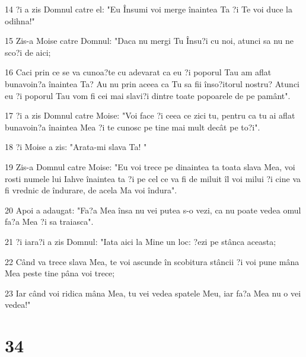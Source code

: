 \par 14 ?i a zis Domnul catre el: "Eu Însumi voi merge înaintea Ta ?i Te voi duce la odihna!"
\par 15 Zis-a Moise catre Domnul: "Daca nu mergi Tu Însu?i cu noi, atunci sa nu ne sco?i de aici;
\par 16 Caci prin ce se va cunoa?te cu adevarat ca eu ?i poporul Tau am aflat bunavoin?a înaintea Ta? Au nu prin aceea ca Tu sa fii înso?itorul nostru? Atunci eu ?i poporul Tau vom fi cei mai slavi?i dintre toate popoarele de pe pamânt".
\par 17 ?i a zis Domnul catre Moise: "Voi face ?i ceea ce zici tu, pentru ca tu ai aflat bunavoin?a înaintea Mea ?i te cunosc pe tine mai mult decât pe to?i".
\par 18 ?i Moise a zis: "Arata-mi slava Ta! "
\par 19 Zis-a Domnul catre Moise: "Eu voi trece pe dinaintea ta toata slava Mea, voi rosti numele lui Iahve înaintea ta ?i pe cel ce va fi de miluit îl voi milui ?i cine va fi vrednic de îndurare, de acela Ma voi îndura".
\par 20 Apoi a adaugat: "Fa?a Mea însa nu vei putea s-o vezi, ca nu poate vedea omul fa?a Mea ?i sa traiasca".
\par 21 ?i iara?i a zis Domnul: "Iata aici la Mine un loc: ?ezi pe stânca aceasta;
\par 22 Când va trece slava Mea, te voi ascunde în scobitura stâncii ?i voi pune mâna Mea peste tine pâna voi trece;
\par 23 Iar când voi ridica mâna Mea, tu vei vedea spatele Meu, iar fa?a Mea nu o vei vedea!"

\chapter{34}

